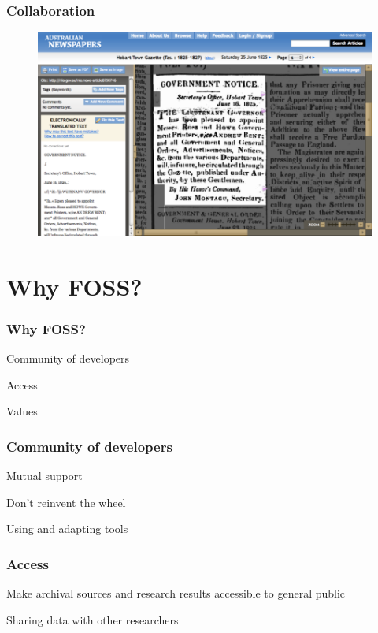 \documentclass[ignorenonframetext,11pt]{beamer}
\begin{document}
\begin{frame}
\frametitle{Collaboration}
\label{collaboration}

\begin{figure}
	\label{hobarttowngazette}
	\begin{center}
	\includegraphics[keepaspectratio,width=\textwidth, height=.75\textheight]{images/htg.png}
	\end{center}
	\end{figure}
	



\end{frame}
		

\section{Why FOSS?}
\label{whyfoss}

\begin{frame}
\frametitle{Why FOSS?}
\label{whyfoss}

Community of developers


Access


Values



\end{frame}
		

\begin{frame}
\frametitle{Community of developers}
\label{communityofdevelopers}

Mutual support


Don't reinvent the wheel


Using and adapting tools



\end{frame}
		

\begin{frame}
\frametitle{Access}
\label{access}

Make archival sources and research results accessible to general public


Sharing data with other researchers



\end{frame}
		
\end{document}
